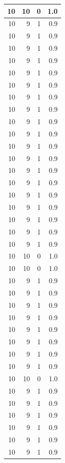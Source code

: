 \documentclass[]{tufte-book}
\begin{document}
\begin{enumerate}
\begin{tabular}{r|r|r|r}
  \hline
  10 & 10 & 0 & 1.0\\
  \hline
  10 & 9 & 1 & 0.9\\
  \hline
  10 & 9 & 1 & 0.9\\
  \hline
  10 & 9 & 1 & 0.9\\
  \hline
  10 & 9 & 1 & 0.9\\
  \hline
  10 & 9 & 1 & 0.9\\
  \hline
  10 & 9 & 1 & 0.9\\
  \hline
  10 & 9 & 1 & 0.9\\
  \hline
  10 & 9 & 1 & 0.9\\
  \hline
  10 & 9 & 1 & 0.9\\
  \hline
  10 & 9 & 1 & 0.9\\
  \hline
  10 & 9 & 1 & 0.9\\
  \hline
  10 & 9 & 1 & 0.9\\
  \hline
  10 & 9 & 1 & 0.9\\
  \hline
  10 & 9 & 1 & 0.9\\
  \hline
  10 & 9 & 1 & 0.9\\
  \hline
  10 & 9 & 1 & 0.9\\
  \hline
  10 & 9 & 1 & 0.9\\
  \hline
  10 & 9 & 1 & 0.9\\
  \hline
  10 & 9 & 1 & 0.9\\
  \hline
  10 & 10 & 0 & 1.0\\
  \hline
  10 & 10 & 0 & 1.0\\
  \hline
  10 & 9 & 1 & 0.9\\
  \hline
  10 & 9 & 1 & 0.9\\
  \hline
  10 & 9 & 1 & 0.9\\
  \hline
  10 & 9 & 1 & 0.9\\
  \hline
  10 & 9 & 1 & 0.9\\
  \hline
  10 & 9 & 1 & 0.9\\
  \hline
  10 & 9 & 1 & 0.9\\
  \hline
  10 & 9 & 1 & 0.9\\
  \hline
  10 & 10 & 0 & 1.0\\
  \hline
  10 & 9 & 1 & 0.9\\
  \hline
  10 & 9 & 1 & 0.9\\
  \hline
  10 & 9 & 1 & 0.9\\
  \hline
  10 & 9 & 1 & 0.9\\
  \hline
  10 & 9 & 1 & 0.9\\
  \hline
  10 & 9 & 1 & 0.9\\
  \hline

\end{tabular}
\end{enumerate}
\end{document}
